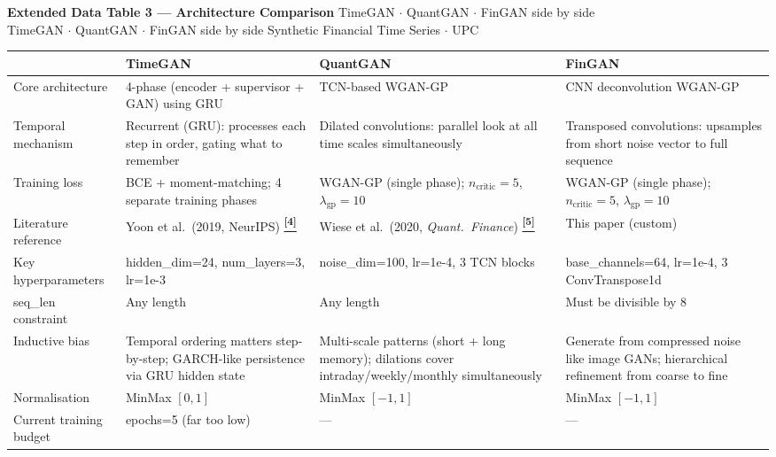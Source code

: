 \documentclass[10pt]{article}
\newcommand{\pagehead}[2]{%
  \begin{tcolorbox}[enhanced,arc=0pt,outer arc=0pt,boxrule=0pt,
    colback=Navy,colframe=Navy,
    top=5pt,bottom=5pt,left=8pt,right=8pt,
    before skip=0pt,after skip=10pt]
  {\color{white}\large\bfseries #1}%
  \ifx\relax#2\relax\else\\[1pt]{\color{blue!30!white}\small #2}\fi
  \hfill{\color{blue!20!white}\footnotesize Synthetic Financial Time Series $\cdot$ UPC}
  \end{tcolorbox}}
\newcommand{\tcite}[1]{%
  \hyperlink{R:#1}{\textsuperscript{\scriptsize\textbf{[#1]}}}}
\begin{document}
\clearpage

\pagehead{Extended Data Table 3 --- Architecture Comparison}
         {TimeGAN $\cdot$ QuantGAN $\cdot$ FinGAN side by side}

\vspace{4pt}
{\small
\begin{tabularx}{\linewidth}{@{}lXXX@{}}
\toprule
 & \textbf{\textcolor{TGcol}{TimeGAN}} & \textbf{\textcolor{QGcol}{QuantGAN}} & \textbf{\textcolor{FGcol}{FinGAN}} \\
\midrule
Core architecture & 4-phase (encoder + supervisor + GAN) using GRU & TCN-based WGAN-GP & CNN deconvolution WGAN-GP \\
Temporal mechanism & Recurrent (GRU): processes each step in order, gating what to remember & Dilated convolutions: parallel look at all time scales simultaneously & Transposed convolutions: upsamples from short noise vector to full sequence \\
Training loss & BCE + moment-matching; 4 separate training phases & WGAN-GP (single phase); $n_\text{critic}=5$, $\lambda_\text{gp}=10$ & WGAN-GP (single phase); $n_\text{critic}=5$, $\lambda_\text{gp}=10$ \\
Literature reference & Yoon et al.\ (2019, NeurIPS)\tcite{4} & Wiese et al.\ (2020, \textit{Quant.\ Finance})\tcite{5} & This paper (custom) \\
Key hyperparameters & hidden\_dim=24, num\_layers=3, lr=1e-3 & noise\_dim=100, lr=1e-4, 3 TCN blocks & base\_channels=64, lr=1e-4, 3 ConvTranspose1d \\
seq\_len constraint & Any length & Any length & Must be divisible by 8 \\
Inductive bias & Temporal ordering matters step-by-step; GARCH-like persistence via GRU hidden state & Multi-scale patterns (short + long memory); dilations cover intraday/weekly/monthly simultaneously & Generate from compressed noise like image GANs; hierarchical refinement from coarse to fine \\
Normalisation & MinMax $[0,1]$ & MinMax $[-1,1]$ & MinMax $[-1,1]$ \\
Current training budget & epochs=5 (\textcolor{DRed}{far too low}) & --- & --- \\
\bottomrule
\end{tabularx}}
\end{document}
